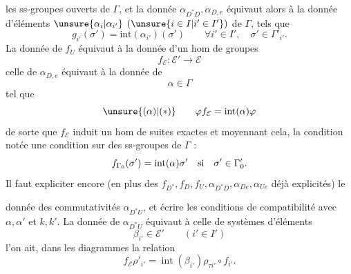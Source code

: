 
les ss-groupes ouverts de $\Gamma$,
et la donnée 
 $\alpha_{D^*D},\alpha_{D,e}$ équivaut alors
à la donnée d'éléments $\unsure{\alpha_i|\alpha_{i'}}$
$(\unsure{i\in I|i'\in I'})$ de $\Gamma$,
tels que
\[
g_{i'}(\sigma')=\mathrm{int}(\alpha_{i'})(\sigma')
\qquad\forall i'\in I',\quad\sigma'\in\Gamma'_{i'}.
\]
La donnée de $f_U$ équivaut à la donnée d'un hom de groupes
\[
\boxed{f_{\mathcal E}:\mathcal E'\to\mathcal E}
\]
celle de $\alpha_{D,e}$ équivaut à la donnée de
\[
\boxed{\alpha\in\Gamma}
\]
tel que
\[
\unsure{(\alpha)|(*)}\qquad
\varphi f_{\mathcal E}=\mathrm{int}(\alpha)\varphi
\]
de sorte que $f_{\mathcal E}$ induit un hom de suites exactes
et moyennant cela, la condition notée \unsure{$(\alpha)$|$(*)$}
 une condition sur des
 ss-groupes de $\Gamma$ :
\[
f_{\Gamma_0}(\sigma')=\mathrm{int}(\alpha)\sigma'
\quad\hbox{si}\quad\sigma'\in\Gamma'_0.
\]
Il faut expliciter encore (en plus des
$f_{D^*},f_D,f_U,\alpha_{D^*D},\alpha_{De},\alpha_{Ue}$
déjà explicités) le

donnée des commutativités $\alpha_{D^*U}$, et écrire les conditions de compatibilité avec $\alpha,\alpha'$ et $k,k'$. La donnée de $\alpha_{D^*U}$ équivaut à celle de systèmes d'éléments
\[
\boxed{\beta_{i'}\in\mathcal E'}\qquad(i'\in I')
\]
 l'on ait, dans les diagrammes
la relation
\[
f_{\mathcal E}\rho'_{i'}=\operatorname{int}(\beta_{i'})\rho_{\tau i'}\circ f_{i'}.
\]

